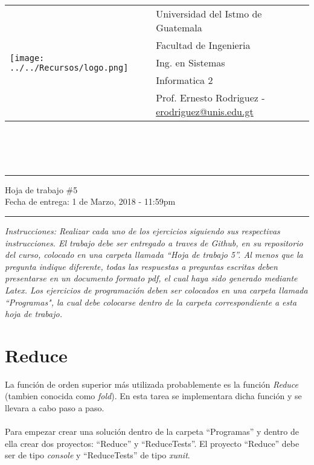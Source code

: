 \documentclass{article}
\newcommand{\horrule}[1]{\rule{\linewidth}{#1}}
\newcommand{\perlscript}[2]{
\begin{itemize}
\item[]
\end{itemize}
}
\begin{document}
\begin{tabular}{l l}
\multirow{5}{*}{\texttt{[image: ../../Recursos/logo.png]}} & Universidad del Istmo de Guatemala \\
 & Facultad de Ingenieria \\
 & Ing. en Sistemas \\
 & Informatica 2 \\
 & Prof. Ernesto Rodriguez - \href{mailto:erodriguez@unis.edu.gt}{erodriguez@unis.edu.gt} \\
\end{tabular}
\\\\\\

\begin{center}
        \horrule{0.5pt}
        \huge{Hoja de trabajo \#5} \\
        \large{Fecha de entrega: 1 de Marzo, 2018 - 11:59pm} \\
        \horrule{1pt}
\end{center}
\emph{Instrucciones: Realizar cada uno de los ejercicios siguiendo sus respectivas
instrucciones. El trabajo debe ser entregado a traves de Github, en su repositorio del curso, colocado en una carpeta llamada ``Hoja de trabajo 5''.
Al menos que la pregunta indique diferente, todas las respuestas a preguntas escritas deben presentarse en
un documento formato pdf, el cual haya sido generado mediante Latex. Los ejercicios de programaci\'on deben ser colocados en una carpeta
llamada ``Programas", la cual debe colocarse dentro de la carpeta correspondiente a esta hoja de trabajo.}


\section*{Reduce}
La funci\'on de orden superior m\'as utilizada probablemente es la funci\'on \emph{Reduce}
(tambien conocida como \emph{fold}). En esta tarea se implementara
dicha funci\'on y se llevara a cabo paso a paso.
\\\\
Para empezar crear una soluci\'on dentro de la carpeta ``Programas''
y dentro de ella crear dos proyectos: ``Reduce'' y ``ReduceTests''.
El proyecto ``Reduce'' debe ser de tipo \emph{console} y ``ReduceTests''
de tipo \emph{xunit}.
\end{document}
